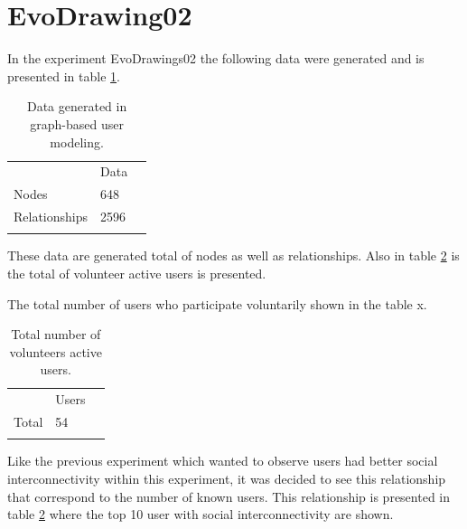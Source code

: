 \section {EvoDrawing02}


In the experiment EvoDrawings02 the following data were generated and is presented in table \ref{tab:dataGenerated_2}.


\begin{table}
\small
\caption{Data generated in graph-based user modeling.}
\label{tab:dataGenerated_2}
\centering
\small
\begin{tabular}{p{3cm} p{3cm} p{3cm} }
\hline\noalign{\smallskip}
  & Data &  \\
\noalign{\smallskip}\hline\noalign{\smallskip}
\small{Nodes} & \small{648} & \\ \hline
\small{Relationships} & \small{2596} & \\ \hline

\noalign{\smallskip}\hline
\end{tabular}
\end{table}

These data are generated total of nodes as well as relationships. Also in table
\ref{tab:totalUsers_1} is the total of volunteer active users is presented.

The total number of users who participate voluntarily shown in the table x.

\begin{table}
\small
\caption{Total number of volunteers active users.}
\label{tab:totalUsers_1}
\centering
\small
\begin{tabular}{p{3cm} p{3cm} p{3cm} }
\hline\noalign{\smallskip}
  & Users &  \\
\noalign{\smallskip}\hline\noalign{\smallskip}
\small{Total } & \small{54} & \\ \hline
\noalign{\smallskip}\hline
\end{tabular}
\end{table}

Like the previous experiment which wanted to observe users had better social
interconnectivity within this experiment, it was decided to see this
relationship that correspond to the number of known users. This relationship is
presented in table \ref{tab:totalUsers_1} where the top 10 user  with social
interconnectivity are shown.


